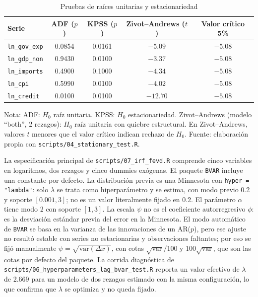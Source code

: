 \documentclass[11pt,a4paper]{article}
\begin{document}
\begin{table}[htbp]
\centering
\small
\begin{threeparttable}
\caption{Pruebas de raíces unitarias y estacionariedad}
\label{tab:raices}
\begin{tabular}{@{}lcccc@{}}
\toprule
Serie & ADF ($p$) & KPSS ($p$) & Zivot--Andrews ($t$) & Valor crítico 5\% \\
\midrule
\texttt{ln\_gov\_exp} & 0.0854 & 0.0161 & $-5.09$ & $-5.08$ \\
\texttt{ln\_gdp\_non} & 0.9430 & 0.0100 & $-3.37$ & $-5.08$ \\
\texttt{ln\_imports}  & 0.4900 & 0.1000 & $-4.34$ & $-5.08$ \\
\texttt{ln\_cpi}      & 0.5990 & 0.0100 & $-4.02$ & $-5.08$ \\
\texttt{ln\_credit}   & 0.0100 & 0.0100 & $-12.70$ & $-5.08$ \\
\bottomrule
\end{tabular}
\begin{tablenotes}\footnotesize
\item Nota: ADF: $H_0$ raíz unitaria. KPSS: $H_0$ estacionariedad. Zivot--Andrews (modelo ``both'', 2 rezagos): $H_0$ raíz unitaria con quiebre estructural. En Zivot--Andrews, valores $t$ menores que el valor crítico indican rechazo de $H_0$. Fuente: elaboración propia con \texttt{scripts/04\_stationary\_test.R}.
\end{tablenotes}
\end{threeparttable}
\end{table}

La especificación principal de \texttt{scripts/07\_irf\_fevd.R} comprende
cinco variables en logaritmos, dos rezagos y cinco dummies exógenas. El
paquete \texttt{BVAR} \parencite{bvar2021} incluye una constante por defecto. La distribución
previa es una Minnesota \parencite{litterman1986} con
\texttt{hyper = "lambda"}: solo $\lambda$ se trata como hiperparámetro y se
estima, con modo previo 0.2 y soporte $[0.001,3]$; no es un valor literalmente fijado en 0.2. El parámetro $\alpha$ tiene modo 2 con soporte $[1,3]$. La escala $\psi$ no es
el coeficiente autorregresivo $\phi$: es la desviación estándar previa del error
en la Minnesota. El modo automático de \texttt{BVAR} se basa en la varianza de
las innovaciones de un AR($p$), pero ese ajuste no resultó estable con series no
estacionarias y observaciones faltantes; por eso se fijó manualmente
$\psi=\sqrt{\text{var}(\Delta x)}$, con cotas $\sqrt{\text{var}}/100$ y
$100\sqrt{\text{var}}$, que son las cotas por defecto del paquete. La
corrida diagnóstica de \texttt{scripts/06\_hyperparameters\_lag\_bvar\_test.R}
reporta un valor efectivo de $\lambda$ de 2.669 para un modelo de dos rezagos
estimado con la misma configuración, lo que confirma que $\lambda$ se
optimiza y no queda fijado.
\end{document}

